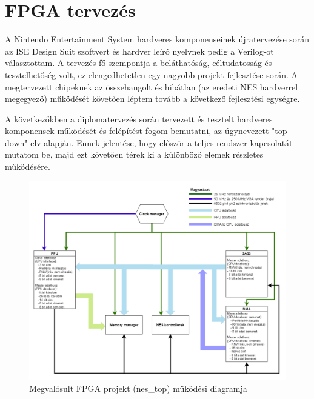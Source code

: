 \chapter{FPGA tervezés}
\label{sec:fpga-desing-begining}

A Nintendo Entertainment System hardveres komponenseinek újratervezése során az ISE Design Suit szoftvert és hardver leíró nyelvnek pedig a Verilog-ot választottam. A tervezés fő szempontja a beláthatóság, céltudatosság és tesztelhetőség volt, ez elengedhetetlen egy nagyobb projekt fejlesztése során. A megtervezett chipeknek az összehangolt és hibátlan (az eredeti NES hardverrel megegyező) működését követően léptem tovább a következő fejlesztési egységre.

A következőkben a diplomatervezés során tervezett és tesztelt hardveres komponensek működését és felépítést fogom bemutatni, az úgynevezett "top-down" elv alapján. Ennek jelentése, hogy először a teljes rendszer kapcsolatát mutatom be, majd ezt követően térek ki a különböző elemek részletes működésére.

\begin{figure}[H]
	\centering
	\includegraphics[width=150mm, keepaspectratio]{figures/FPGA-toplevel-diagram}
	\caption{Megvalósult FPGA projekt (nes\_top) működési diagramja} 
	\label{fig:FPGA-toplevel-diagram}
\end{figure}

